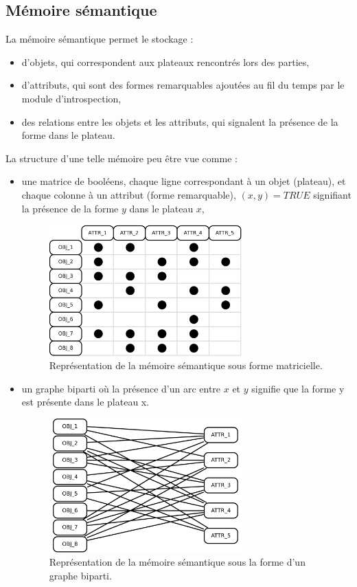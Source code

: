 \subsection{Mémoire sémantique}
\label{conception_memoire_semantique}

La mémoire sémantique permet le stockage :
\begin{itemize}
\item d'objets, qui correspondent aux plateaux rencontrés lors des parties,
\item d'attributs, qui sont des formes remarquables ajoutées au fil du temps par le module  d'introspection,
\item des relations entre les objets et les attributs, qui signalent la présence de la forme dans le plateau.
\end{itemize}

La structure d'une telle mémoire peu être vue comme :
\begin{itemize}
\item une matrice de booléens, chaque ligne correspondant à un objet (plateau), et chaque colonne à un attribut (forme remarquable), $(x,y)=TRUE$ signifiant la présence de la forme $y$ dans le plateau $x$,
\begin{figure}[H]
\centering
\includegraphics[width=0.7\textwidth]{files/memoire/context_matrix}
\caption{Représentation de la mémoire sémantique sous forme matricielle.}
\end{figure}


\item un graphe biparti où la présence d'un arc entre $x$ et $y$ signifie que la forme y est présente dans le plateau x.
\begin{figure}[H]
\centering
\includegraphics[width=0.7\textwidth]{files/memoire/context_graph}
\caption{Représentation de la mémoire sémantique sous la forme d'un graphe biparti.}
\end{figure}
\end{itemize}